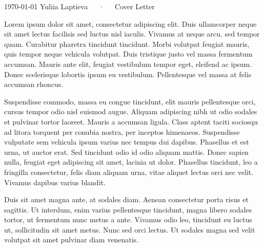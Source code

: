 \documentclass[11pt, a4paper]{awesome-cv}
\begin{document}
\makecvheader[R]

\makecvfooter
  {\today}
  {Yuliia Laptieva~~~·~~~Cover Letter}
  {}

\makelettertitle

\begin{cvletter}

Lorem ipsum dolor sit amet, consectetur adipiscing elit. Duis ullamcorper neque sit amet lectus facilisis sed luctus nisl iaculis. Vivamus at neque arcu, sed tempor quam. Curabitur pharetra tincidunt tincidunt. Morbi volutpat feugiat mauris, quis tempor neque vehicula volutpat. Duis tristique justo vel massa fermentum accumsan. Mauris ante elit, feugiat vestibulum tempor eget, eleifend ac ipsum. Donec scelerisque lobortis ipsum eu vestibulum. Pellentesque vel massa at felis accumsan rhoncus.

Suspendisse commodo, massa eu congue tincidunt, elit mauris pellentesque orci, cursus tempor odio nisl euismod augue. Aliquam adipiscing nibh ut odio sodales et pulvinar tortor laoreet. Mauris a accumsan ligula. Class aptent taciti sociosqu ad litora torquent per conubia nostra, per inceptos himenaeos. Suspendisse vulputate sem vehicula ipsum varius nec tempus dui dapibus. Phasellus et est urna, ut auctor erat. Sed tincidunt odio id odio aliquam mattis. Donec sapien nulla, feugiat eget adipiscing sit amet, lacinia ut dolor. Phasellus tincidunt, leo a fringilla consectetur, felis diam aliquam urna, vitae aliquet lectus orci nec velit. Vivamus dapibus varius blandit.

Duis sit amet magna ante, at sodales diam. Aenean consectetur porta risus et sagittis. Ut interdum, enim varius pellentesque tincidunt, magna libero sodales tortor, ut fermentum nunc metus a ante. Vivamus odio leo, tincidunt eu luctus ut, sollicitudin sit amet metus. Nunc sed orci lectus. Ut sodales magna sed velit volutpat sit amet pulvinar diam venenatis.

\end{cvletter}


\makeletterclosing
\end{document}
